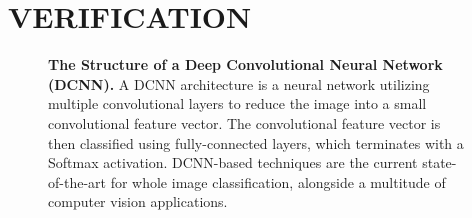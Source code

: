 
\chapter{VERIFICATION} \label{sec:verification}


\begin{figure}[t]%
    \centering
        \caption[The Structure of a Deep Convolutional Neural Network (DCNN)]{\textbf{The Structure of a Deep Convolutional Neural Network (DCNN).}  A DCNN architecture is a neural network utilizing multiple convolutional layers to reduce the image into a small convolutional feature vector.  The convolutional feature vector is then classified using fully-connected layers, which terminates with a Softmax activation.  DCNN-based techniques are the current state-of-the-art for whole image classification, alongside a multitude of computer vision applications.}
        \label{fig:dcnn}
\end{figure}

